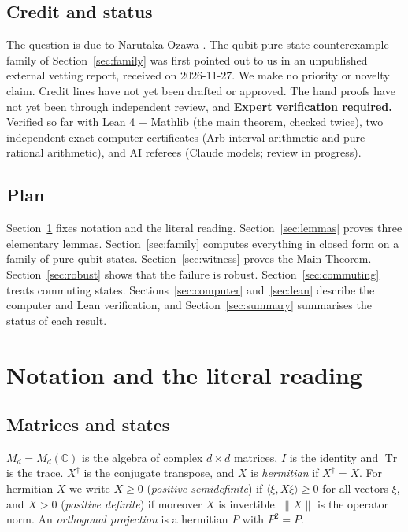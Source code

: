 \documentclass[11pt]{amsart}
\theoremstyle{definition}\newtheorem{definition}[theorem]{Definition}
\theoremstyle{remark}\newtheorem{remark}[theorem]{Remark}
\DeclareMathOperator{\Tr}{Tr}
\newcommand{\C}{\mathbb{C}}
\newcommand{\norm}[1]{\lVert #1\rVert}
\begin{document}
\subsection{Credit and status}
The question is due to Narutaka Ozawa \cite{owr18}. The qubit pure-state counterexample family of Section~\ref{sec:family} was first pointed out to us in an unpublished external vetting report, received on 2026-11-27. We make no priority or novelty claim. Credit lines have not yet been drafted or approved. The hand proofs have not yet been through independent review, and  \textbf{Expert verification required.} Verified so far with Lean 4 + Mathlib (the main theorem, checked twice), two independent exact computer certificates (Arb interval arithmetic and pure rational arithmetic), and AI referees (Claude models; review in progress).

\subsection{Plan}
Section~\ref{sec:notation} fixes notation and the literal reading. Section~\ref{sec:lemmas} proves three elementary lemmas. Section~\ref{sec:family} computes everything in closed form on a family of pure qubit states. Section~\ref{sec:witness} proves the Main Theorem. Section~\ref{sec:robust} shows that the failure is robust. Section~\ref{sec:commuting} treats commuting states. Sections~\ref{sec:computer} and~\ref{sec:lean} describe the computer and Lean verification, and Section~\ref{sec:summary} summarises the status of each result.

\section{Notation and the literal reading}\label{sec:notation}

\subsection{Matrices and states}
\(M_d=M_d(\C)\) is the algebra of complex \(d\times d\) matrices, \(I\) is the identity and \(\Tr\) is the trace. \(X^\dagger\) is the conjugate transpose, and \(X\) is \emph{hermitian} if \(X^\dagger=X\). For hermitian \(X\) we write \(X\ge0\) (\emph{positive semidefinite}) if \(\langle\xi,X\xi\rangle\ge0\) for all vectors \(\xi\), and \(X>0\) (\emph{positive definite}) if moreover \(X\) is invertible. \(\norm{X}\) is the operator norm. An \emph{orthogonal projection} is a hermitian \(P\) with \(P^2=P\).
\end{document}
